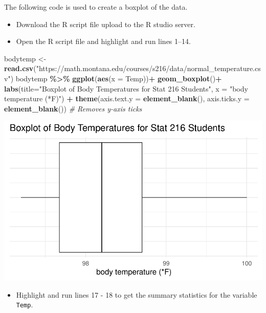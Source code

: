 \documentclass[
]{report}
\newenvironment{Shaded}{\begin{snugshade}}{\end{snugshade}}
\newcommand{\AttributeTok}[1]{\textcolor[rgb]{0.13,0.29,0.53}{#1}}
\newcommand{\CommentTok}[1]{\textcolor[rgb]{0.56,0.35,0.01}{\textit{#1}}}
\newcommand{\FunctionTok}[1]{\textcolor[rgb]{0.13,0.29,0.53}{\textbf{#1}}}
\newcommand{\NormalTok}[1]{#1}
\newcommand{\OtherTok}[1]{\textcolor[rgb]{0.56,0.35,0.01}{#1}}
\newcommand{\SpecialCharTok}[1]{\textcolor[rgb]{0.81,0.36,0.00}{\textbf{#1}}}
\newcommand{\StringTok}[1]{\textcolor[rgb]{0.31,0.60,0.02}{#1}}
\providecommand{\tightlist}{%
  \setlength{\itemsep}{0pt}\setlength{\parskip}{0pt}}
\begin{document}
The following code is used to create a boxplot of the data.

\begin{itemize}
\item
  Download the R script file upload to the R studio server.
\item
  Open the R script file and highlight and run lines 1--14.
\end{itemize}

\begin{Shaded}
\begin{Highlighting}[]
\NormalTok{bodytemp }\OtherTok{\textless{}{-}} \FunctionTok{read.csv}\NormalTok{(}\StringTok{"https://math.montana.edu/courses/s216/data/normal\_temperature.csv"}\NormalTok{)}
\NormalTok{bodytemp }\SpecialCharTok{\%\textgreater{}\%}
  \FunctionTok{ggplot}\NormalTok{(}\FunctionTok{aes}\NormalTok{(}\AttributeTok{x =}\NormalTok{ Temp))}\SpecialCharTok{+}
  \FunctionTok{geom\_boxplot}\NormalTok{()}\SpecialCharTok{+}
  \FunctionTok{labs}\NormalTok{(}\AttributeTok{title=}\StringTok{"Boxplot of Body Temperatures for Stat 216 Students"}\NormalTok{,}
       \AttributeTok{x =} \StringTok{"body temperature (*F)"}\NormalTok{) }\SpecialCharTok{+}
        \FunctionTok{theme}\NormalTok{(}\AttributeTok{axis.text.y =} \FunctionTok{element\_blank}\NormalTok{(), }
          \AttributeTok{axis.ticks.y =} \FunctionTok{element\_blank}\NormalTok{()) }\CommentTok{\# Removes y{-}axis ticks}
\end{Highlighting}
\end{Shaded}

\begin{center}\includegraphics[width=0.7\linewidth]{06-A13-quantitative_theory_files/figure-latex/unnamed-chunk-1-1} \end{center}

\begin{itemize}
\tightlist
\item
  Highlight and run lines 17 - 18 to get the summary statistics for the variable \texttt{Temp}.
\end{itemize}
\end{document}
